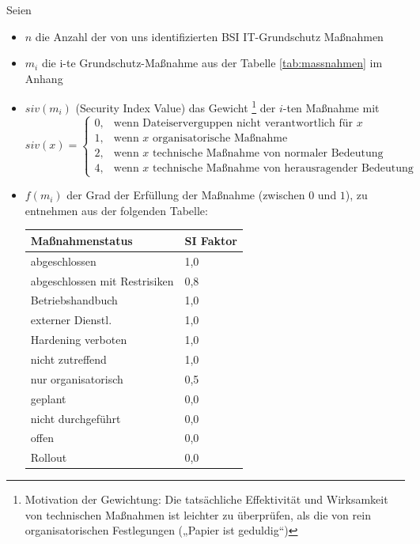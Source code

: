 Seien
\begin{itemize}
\item $n$ die Anzahl der von uns identifizierten BSI IT-Grundschutz Maßnahmen
\item $m_i$ die i-te Grundschutz-Maßnahme aus der Tabelle \ref{tab:massnahmen} im Anhang
\item $siv(m_i)$ (Security Index Value) das Gewicht \footnote{Motivation der Gewichtung: Die tatsächliche Effektivität und Wirksamkeit von technischen Maßnahmen ist leichter zu überprüfen, als die von rein organisatorischen Festlegungen („Papier ist geduldig“)} der $i$-ten Maßnahme mit
\begin{equation}
siv(x)=
\begin{cases}
    0,& \text{wenn Dateiserverguppen nicht verantwortlich für $x$ }\\
    1,& \text{wenn $x$ organisatorische Maßnahme}\\
    2,& \text{wenn $x$ technische Maßnahme von normaler Bedeutung}\\
    4,& \text{wenn $x$ technische Maßnahme von herausragender Bedeutung}
\end{cases}
\end{equation}
\item $f(m_i)$ der Grad der Erfüllung der Maßnahme (zwischen $0$ und $1$), zu entnehmen aus der folgenden Tabelle: \\

\begin{minipage}{\textwidth}
\begin{center}
\begin{tabular}{ll}
\toprule
Maßnahmenstatus & SI Faktor \\
\midrule
abgeschlossen & 1,0 \\
abgeschlossen mit Restrisiken & 0,8 \\
Betriebshandbuch & 1,0 \\
externer Dienstl. & 1,0 \\
Hardening verboten & 1,0 \\
nicht zutreffend & 1,0 \\
nur organisatorisch & 0,5 \\
geplant & 0,0 \\
nicht durchgeführt & 0,0 \\
offen & 0,0 \\
Rollout & 0,0  \\
\bottomrule
\end{tabular}
\end{center}
\end{minipage}
\end{itemize}
\bigskip

